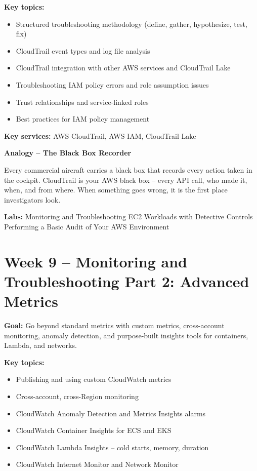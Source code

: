 \documentclass[12pt,a4paper]{article}
\begin{document}
\textbf{Key topics:}
\begin{itemize}[leftmargin=1.5em]
  \item Structured troubleshooting methodology (define, gather, hypothesize, test, fix)
  \item CloudTrail event types and log file analysis
  \item CloudTrail integration with other AWS services and CloudTrail Lake
  \item Troubleshooting IAM policy errors and role assumption issues
  \item Trust relationships and service-linked roles
  \item Best practices for IAM policy management
\end{itemize}

\textbf{Key services:} AWS CloudTrail, AWS IAM, CloudTrail Lake

\begin{analogybox}
\textbf{Analogy -- The Black Box Recorder}

Every commercial aircraft carries a black box that records every action taken in
the cockpit. CloudTrail is your AWS black box -- every API call, who made it,
when, and from where. When something goes wrong, it is the first place investigators
look.
\end{analogybox}

\textbf{Labs:} Monitoring and Troubleshooting EC2 Workloads with Detective Controls
\textbullet{} Performing a Basic Audit of Your AWS Environment

\newpage

\section{Week 9 -- Monitoring and Troubleshooting Part 2: Advanced Metrics}

\textbf{Goal:} Go beyond standard metrics with custom metrics, cross-account
monitoring, anomaly detection, and purpose-built insights tools for containers,
Lambda, and networks.

\textbf{Key topics:}
\begin{itemize}[leftmargin=1.5em]
  \item Publishing and using custom CloudWatch metrics
  \item Cross-account, cross-Region monitoring
  \item CloudWatch Anomaly Detection and Metrics Insights alarms
  \item CloudWatch Container Insights for ECS and EKS
  \item CloudWatch Lambda Insights -- cold starts, memory, duration
  \item CloudWatch Internet Monitor and Network Monitor
\end{itemize}
\end{document}
